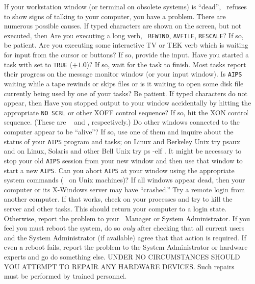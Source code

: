      If your workstation window (or terminal on obsolete systems) is
``dead'', \ie\ refuses to show signs of talking to your computer, you
have a problem. There are numerous possible causes.  If typed
characters are shown on the screen, but not executed, then
\xben
\Item Are you executing a long verb, \eg\ {\tt REWIND}, {\tt AVFILE},
      {\tt RESCALE}?  If so, be patient.
\Item Are you executing some interactive TV or TEK verb which is
      waiting for input from the cursor or buttons?  If so, provide
      the input.
\Item Have you started a task with {\tt {}} set to
      {\tt TRUE} ($+1.0$)?  If so, wait for the task to finish.  Most
      tasks report their progress on the message monitor window (or
      your input window).
\Item Is {\tt AIPS} waiting while a tape rewinds or skips files
      or is it waiting to open some disk file currently being used by
      one of your tasks?  Be patient.
\xeen
\noindent If typed characters do not appear, then
\xben
\Item Have you stopped output to your window accidentally by
      hitting the appropriate {\tt NO SCRL} or other XOFF control
      sequence?  If so, hit the XON control sequence. (These are {\tt
      } and {\tt {}}, respectively.)
\Item Do other windows connected to the computer appear to be
      ``alive''?  If so, use one of them and inquire about the status
      of your {\tt AIPS} program and tasks; on Linux and Berkeley Unix
      try {\us ps\qs aux \CR} and on Linux, Solaris and other Bell
      Unix try {\us ps -elf \hbox{\CR}}.  It might be necessary to
      stop your old {\tt AIPS} session from your new window and then
      use that window to start a new {\tt AIPS}\@.
\Item Can you abort {\tt AIPS} at your window using the appropriate
      system commands (\ie\ {\tt {}} on Unix machines)?
\Item If all windows appear dead, then your computer or its
      X-Windows server may have ``crashed.''  Try a remote login from
      another computer.  If that works, check on your processes and
      try to kill the server and other tasks.  This should return your
      computer to a login state.  Otherwise, report the problem to
      your \AIPS\ Manager or System Administrator.  If you feel you
      must reboot the system, do so {\it only\/} after checking that
      all current users and the System Administrator (if available)
      agree that that action is required.
\Item If even a reboot fails, report the problem to the System
      Administrator or hardware experts and go do something else.
      UNDER NO CIRCUMSTANCES SHOULD YOU ATTEMPT TO REPAIR ANY
      HARDWARE DEVICES. Such repairs must be performed by trained
      personnel.
\xeen

